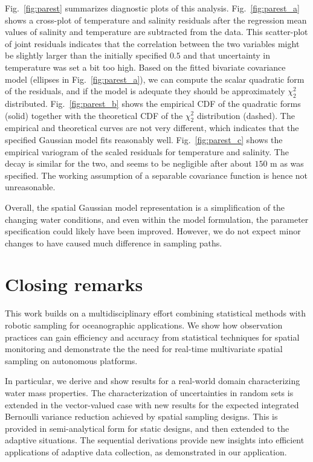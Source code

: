 \documentclass[aoas,preprint]{imsart}
\begin{document}
Fig.~\ref{fig:parest} summarizes diagnostic plots of this
analysis. Fig.~\ref{fig:parest_a} shows a cross-plot of temperature
and salinity residuals after the regression mean values of salinity
and temperature are subtracted from the data. This scatter-plot of
joint residuals indicates that the correlation between the two
variables might be slightly larger than the initially specified $0.5$
and that uncertainty in temperature was set a bit too high. Based on
the fitted bivariate covariance model (ellipses in
Fig.~\ref{fig:parest_a}), we can compute the scalar quadratic form of
the residuals, and if the model is adequate they should be
approximately $\chi^2_2$ distributed. Fig.~\ref{fig:parest_b} shows
the empirical CDF of the quadratic forms (solid) together with the
theoretical CDF of the $\chi^2_2$ distribution (dashed). The empirical
and theoretical curves are not very different, which indicates that
the specified Gaussian model fits reasonably
well. Fig.~\ref{fig:parest_c} shows the empirical variogram of the
scaled residuals for temperature and salinity. The decay is similar
for the two, and seems to be negligible after about $150$ m as was
specified. The working assumption of a separable covariance function
is hence not unreasonable.

Overall, the spatial Gaussian model representation is a simplification
of the changing water conditions, and even within the model
formulation, the parameter specification could likely have been
improved.  However, we do not expect minor changes to have caused much
difference in sampling paths.

\section{Closing remarks}
\label{sec:concl_disc}

This work builds on a multidisciplinary effort combining statistical
methods with robotic sampling for oceanographic applications. We show
how observation practices can gain efficiency and accuracy from
statistical techniques for spatial monitoring and demonstrate the the
need for real-time multivariate spatial sampling on autonomous
platforms.

In particular, we derive and show results for a real-world domain
characterizing water mass properties. The characterization of
uncertainties in random sets is extended in the vector-valued case
with new results for the expected integrated Bernoulli variance
reduction achieved by spatial sampling designs. This is provided in
semi-analytical form for static designs, and then extended to the
adaptive situations. The sequential derivations provide new insights
into efficient applications of adaptive data collection, as
demonstrated in our application.
\end{document}
